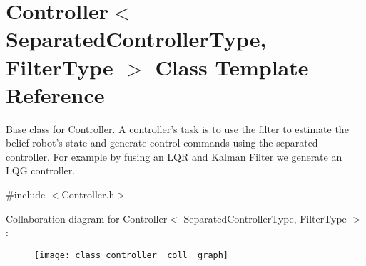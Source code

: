 \hypertarget{class_controller}{\section{\-Controller$<$ \-Separated\-Controller\-Type, \-Filter\-Type $>$ \-Class \-Template \-Reference}
\label{class_controller}
}


\-Base class for \hyperlink{class_controller}{\-Controller}. \-A controller's task is to use the filter to estimate the belief robot's state and generate control commands using the separated controller. \-For example by fusing an \-L\-Q\-R and \-Kalman \-Filter we generate an \-L\-Q\-G controller.  




{\ttfamily \#include $<$\-Controller.\-h$>$}



\-Collaboration diagram for \-Controller$<$ \-Separated\-Controller\-Type, \-Filter\-Type $>$\-:
\nopagebreak
\begin{figure}[H]
\begin{center}
\leavevmode
\texttt{[image: class\_controller\_\_coll\_\_graph]}
\end{center}
\end{figure}
